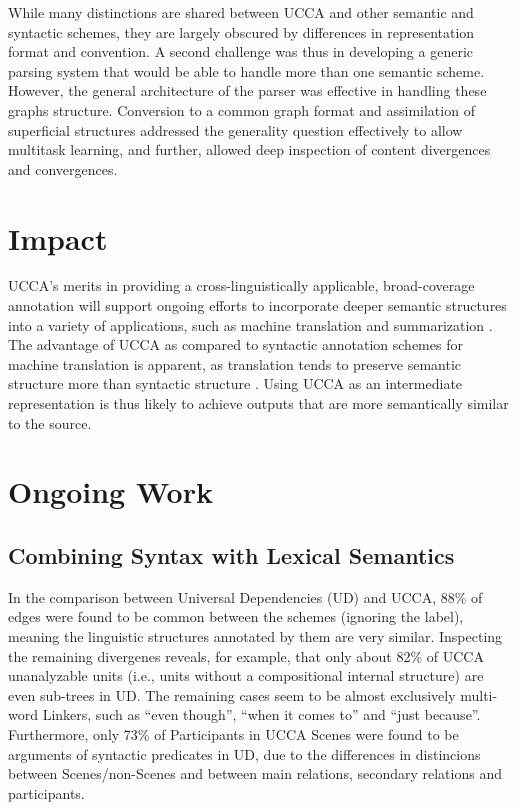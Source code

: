 \documentclass[12pt,a4paper]{report}
\begin{document}
While many distinctions are shared between UCCA and other semantic and syntactic schemes,
they are largely obscured by differences in representation format and convention.
A second challenge was thus in developing a generic parsing system that would be able
to handle more than one semantic scheme.
However, the general architecture of the parser was effective in handling these
graphs structure.
Conversion to a common graph format and assimilation of superficial structures
addressed the generality question effectively to allow multitask learning,
and further, allowed deep inspection of content divergences and convergences.

\section*{Impact}

UCCA's merits in providing a cross-linguistically applicable,
broad-coverage annotation will support ongoing efforts to incorporate deeper
semantic structures into a variety of applications, such as machine translation
\citep{jones2012semantics} and summarization \citep{liu2015toward}.
The advantage of UCCA as compared to syntactic annotation schemes for machine translation is apparent,
as translation tends to preserve semantic structure more than syntactic structure \citep{sulem2015conceptual}.
Using UCCA as an intermediate representation is thus likely to achieve outputs that are more
semantically similar to the source.

\section*{Ongoing Work}

\subsection*{Combining Syntax with Lexical Semantics}

In the comparison between Universal Dependencies (UD) and UCCA,
88\% of edges were found to be common between the schemes (ignoring the label),
meaning the linguistic structures annotated by them are very similar.
Inspecting the remaining divergenes reveals, for example, that only
about 82\% of UCCA unanalyzable units (i.e., units without a compositional
internal structure) are even sub-trees in UD.
The remaining cases seem to be almost exclusively multi-word Linkers,
such as ``even though'', ``when it comes to'' and ``just because''.
Furthermore, only 73\% of Participants in UCCA Scenes were found to be arguments
of syntactic predicates in UD, due to the differences in distincions between
Scenes/non-Scenes and between main relations, secondary relations and participants.
\end{document}
